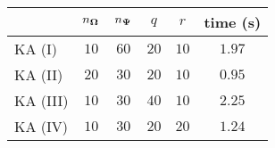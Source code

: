 \centering
\renewcommand{\arraystretch}{1.2}
\begin{tabular}{@{}lccccc@{}}
\toprule
 & $n_{\boldsymbol{\Omega}}$ & $n_{\boldsymbol{\Psi}}$ & $q$ & $r$ & time (s)\\
\midrule
KA (I) & $10$ & $60$ & $20$ & $10$ & $1.97$ \\
KA (II) & $20$ & $30$ & $20$ & $10$ & $0.95$ \\
KA (III) & $10$ & $30$ & $40$ & $10$ & $2.25$ \\
KA (IV) & $10$ & $30$ & $20$ & $20$ & $1.24$ \\
\bottomrule
\end{tabular}
